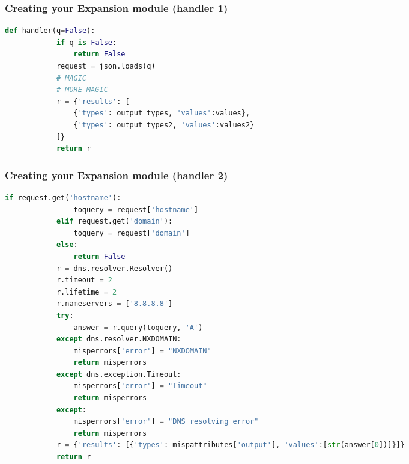 \begin{frame}[fragile]
      \frametitle{Creating your Expansion module (handler 1)}
      \begin{adjustbox}{width=\textwidth,height=5cm,keepaspectratio}
      \begin{lstlisting}[language=python]
        def handler(q=False):
            if q is False:
                return False
            request = json.loads(q)
            # MAGIC
            # MORE MAGIC
            r = {'results': [
                {'types': output_types, 'values':values},
                {'types': output_types2, 'values':values2}
            ]}
            return r
              \end{lstlisting}
        \end{adjustbox}
\end{frame}


\begin{frame}[fragile]
      \frametitle{Creating your Expansion module (handler 2)}
      \begin{adjustbox}{width=\textwidth,height=5cm,keepaspectratio}
      \begin{lstlisting}[language=python]
            if request.get('hostname'):
                toquery = request['hostname']
            elif request.get('domain'):
                toquery = request['domain']
            else:
                return False
            r = dns.resolver.Resolver()
            r.timeout = 2
            r.lifetime = 2
            r.nameservers = ['8.8.8.8']
            try:
                answer = r.query(toquery, 'A')
            except dns.resolver.NXDOMAIN:
                misperrors['error'] = "NXDOMAIN"
                return misperrors
            except dns.exception.Timeout:
                misperrors['error'] = "Timeout"
                return misperrors
            except:
                misperrors['error'] = "DNS resolving error"
                return misperrors
            r = {'results': [{'types': mispattributes['output'], 'values':[str(answer[0])]}]}
            return r
              \end{lstlisting}
        \end{adjustbox}
\end{frame}

